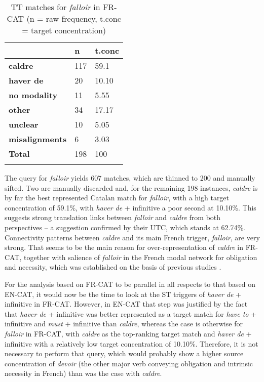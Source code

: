 \documentclass[output=paper,english,spanish,german,english]{langsci/langscibook}
\begin{document}
\begin{table}\caption{TT matches for \textit{falloir} in FR-CAT (n = raw frequency, t.conc = target concentration)}\label{falloir}
  \begin{tabularx}{\textwidth}{lYY}
    \lsptoprule
    & {\bfseries n} & {\bfseries t.conc}\\
    \midrule
    {\bfseries caldre} & 117 & 59.1\\
    {\bfseries haver de} & 20 & 10.10\\
    {\bfseries no modality} & 11 & 5.55\\
    {\bfseries other} & 34 & 17.17\\
    {\bfseries unclear} & 10 & 5.05\\
    {\bfseries misalignments} & 6 & 3.03\\
    \midrule
    {\bfseries Total} & 198 & 100\\
    \lspbottomrule
  \end{tabularx}
\end{table}

The query for \textit{falloir} yields 607 matches, which are thinned to 200 and manually sifted. Two are manually discarded and, for the remaining 198 instances, \textit{caldre} is by far the best represented Catalan match for \textit{falloir}, with a high target concentration of 59.1\%, with \textit{haver de} + infinitive a poor second at 10.10\%. This suggests strong translation links between \textit{falloir} and \textit{caldre} from both perspectives -- a suggestion confirmed by their UTC, which stands at 62.74\%. Connectivity patterns between \textit{caldre} and its main French trigger, \textit{falloir}, are very strong. That seems to be the main reason for over-representation of \textit{caldre} in FR-CAT, together with salience of \textit{falloir} in the French modal network for obligation and necessity, which was established on the basis of previous studies \parencites{lablab13}{lewis15}.

For the analysis based on FR-CAT to be parallel in all respects to that based on EN-CAT, it would now be the time to look at the ST triggers of \textit{haver de} + infinitive in FR-CAT. However, in EN-CAT that step was justified by the fact that \textit{haver de} + infinitive was better represented as a target match for \textit{have to} + infinitive and \textit{must} + infinitive than \textit{caldre}, whereas the case is otherwise for \textit{falloir} in FR-CAT, with \textit{caldre} as the top-ranking target match and \textit{haver de} + infinitive with a relatively low target concentration of 10.10\%. Therefore, it is not necessary to perform that query, which would probably show a higher source concentration of \textit{devoir} (the other major verb conveying obligation and intrinsic necessity in French) than was the case with \textit{caldre}.
\end{document}
